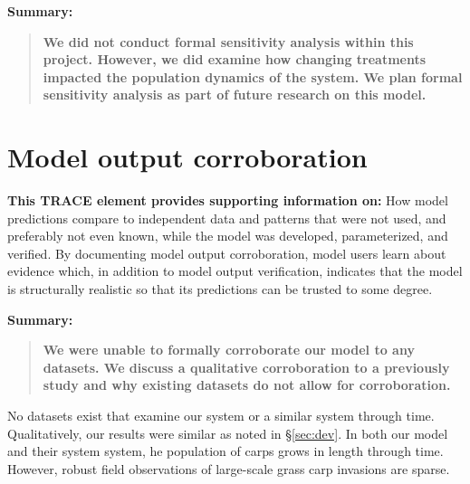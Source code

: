 \documentclass{article}[12pt]
\begin{document}
\textbf{Summary:}
\begin{verse}
\textbf{
We did not conduct formal sensitivity analysis within this project.
However, we did examine how changing treatments impacted the population dynamics of the system.
We plan formal sensitivity analysis as part of future research on this model.
}
\end{verse}

\section{Model output corroboration}

\textbf{This TRACE element provides supporting information on:}  How model predictions compare to independent data and patterns that were not used, and preferably not even known, while the model was developed, parameterized, and verified. By documenting model output corroboration, model users learn about evidence which, in addition to model output verification, indicates that the model is structurally realistic so that its predictions can be trusted to some degree. 

\textbf{Summary:}
\begin{verse}
\textbf{
We were unable to formally corroborate our model to any datasets.
We discuss a qualitative corroboration to a previously study and why existing datasets do not allow for corroboration.
}
\end{verse}

No datasets exist that examine our system or a similar system through time.
Qualitatively, our results were similar \citet{martyn1986mapping} as noted in \S \ref{sec:dev}.
In both our model and their system system, he population of carps grows in length through time. 
However, robust field observations of large-scale grass carp invasions are sparse. 




\end{document}
